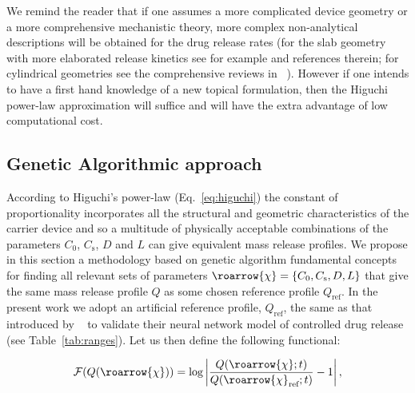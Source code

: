\documentclass[superbib,unsortedaddress,preprint,byrevtex,aps,noshowpacs,titlepage]{revtex4}
\def\vchi{\roarrow{\chi}}
\def\vchiref{\roarrow{\chi}_\text{ref}}
\def\Qref{Q_\text{ref}}
\def\calF{\mathcal{F}}
\def\Co{C_0}
\def\Cs{C_\text{s}}
\begin{document}
We remind the reader that if one assumes a more complicated device geometry
or a more comprehensive mechanistic theory, more complex non-analytical descriptions will be obtained for 
the drug release rates (for the slab geometry with more elaborated release kinetics see for 
example \cite{Frenning2003,Kalia2001a} and references therein; for cylindrical geometries see 
the comprehensive reviews in ~\cite{Siepmann2000,Siepmann2001,Siepmann2002}). 
However if one intends to have a first hand knowledge of a new topical formulation, then the Higuchi 
power-law approximation will suffice and will have the extra advantage of low computational cost.

\subsection{Genetic Algorithmic approach}
\label{meth:ga}

According to Higuchi's power-law (Eq.~\ref{eq:higuchi}) the constant of proportionality incorporates 
all the structural and geometric characteristics of the carrier device and so a multitude of physically acceptable
combinations of the parameters $\Co$, $\Cs$, $D$ and $L$ can give equivalent mass release profiles. 
We propose in this section a methodology based on genetic algorithm fundamental concepts for finding all 
relevant sets of parameters $\vchi = \{\Co,\Cs, D, L\}$ that give the same mass release profile $Q$ as some 
chosen reference profile $\Qref$.
In the present work we adopt an artificial reference profile, $\Qref$, the same as that introduced
by ~\cite{Reis2004} to validate their neural network model of controlled drug release 
(see Table~\ref{tab:ranges}).   
Let us then define the following functional:

\begin{equation}
  \label{eq:fitness}
  \calF(Q(\vchi)) = \log \left| \frac{Q(\vchi; t)}{Q(\vchiref; t)} - 1 \right|,
\end{equation}
\end{document}
